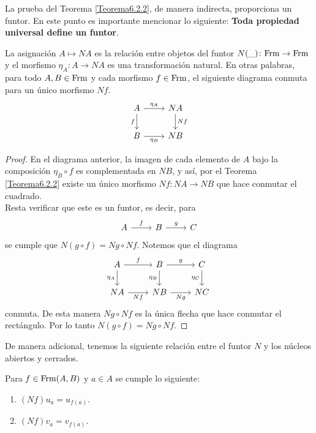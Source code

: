 La prueba del Teorema \ref{Teorema6.2.2}, de manera indirecta, proporciona un funtor. En este punto es importante mencionar lo siguiente: \textbf{Toda propiedad universal define un funtor}.

\begin{thm}\label{Teorema6.2.3}
    La asignación $A\mapsto NA$ es la relación entre objetos del funtor $N( \_ )\colon \mathrm{Frm} \to\mathrm{Frm}$ y el morfismo $\eta_A\colon A\to NA$ es una transformación natural. En otras palabras, para todo $A, B\in \mathrm{Frm}$ y cada morfismo $f\in \mathrm{Frm}$, el siguiente diagrama conmuta para un único morfismo $Nf$.
    \[\begin{tikzcd}
	A & NA \\
	B & NB
	\arrow["{\eta_A}", from=1-1, to=1-2]
	\arrow["f"', from=1-1, to=2-1]
	\arrow["Nf", from=1-2, to=2-2]
	\arrow["{\eta_B}"', from=2-1, to=2-2]
\end{tikzcd}\]
\end{thm}

\begin{proof}
    En el diagrama anterior, la imagen de cada elemento de $A$ bajo la composición $\eta_B\circ f$ es complementada en $NB$, y así, por el Teorema \ref{Teorema6.2.2} existe un único morfismo $Nf\colon NA\to NB$ que hace conmutar el cuadrado.\\

    Resta verificar que este es un funtor, es decir, para
    \[\begin{tikzcd}
	A & B & C
	\arrow["f", from=1-1, to=1-2]
	\arrow["g", from=1-2, to=1-3]
\end{tikzcd}\]
se cumple que $N(g\circ f)=Ng\circ Nf$. Notemos que el diagrama 
\[\begin{tikzcd}
	A & B & C \\
	NA & NB & NC
	\arrow["f", from=1-1, to=1-2]
	\arrow["{\eta_A}"', from=1-1, to=2-1]
	\arrow["g", from=1-2, to=1-3]
	\arrow["{\eta_B}"', from=1-2, to=2-2]
	\arrow["{\eta_C}"', from=1-3, to=2-3]
	\arrow["Nf"', from=2-1, to=2-2]
	\arrow["Ng"', from=2-2, to=2-3]
\end{tikzcd}\]
conmuta. De esta manera $Ng\circ Nf$ es la única flecha que hace conmutar el rectángulo. Por lo tanto $N(g\circ f)=Ng\circ Nf$.
\end{proof}

De manera adicional, tenemos la siguiente relación entre el funtor $N$ y los núcleos abiertos y cerrados.

\begin{cor}\label{Corolario6.2.4}
    Para $f\in \mathrm{Frm}(A, B)$ y $a\in A$ se cumple lo siguiente:
    \begin{enumerate}
        \item $(Nf)u_a=u_{f(a)}$.
        \item $(Nf)v_a=v_{f(a)}$.
    \end{enumerate}
\end{cor}

